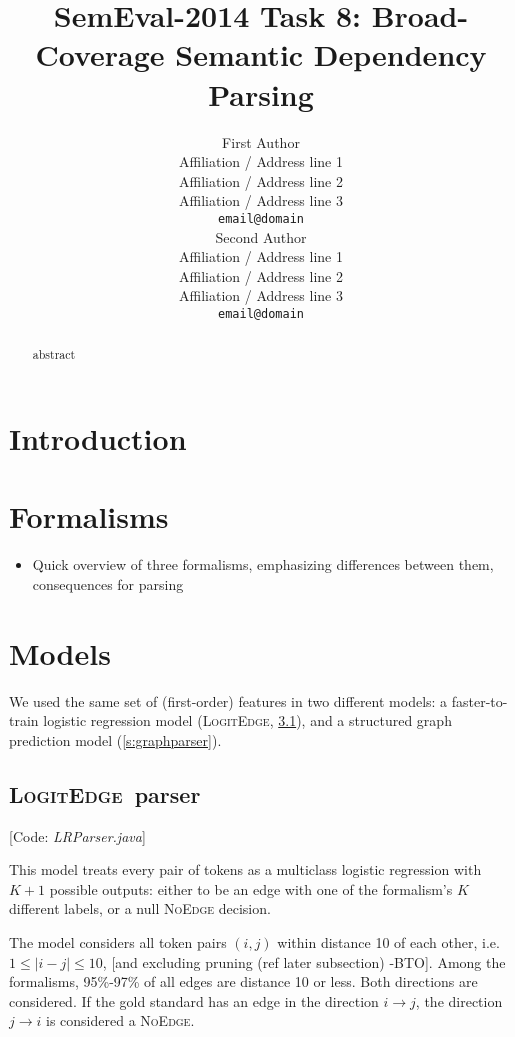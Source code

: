 \documentclass[11pt]{article}
\title{SemEval-2014 Task 8: Broad-Coverage Semantic Dependency Parsing}
\author{First Author \\
  Affiliation / Address line 1 \\
  Affiliation / Address line 2 \\
  Affiliation / Address line 3 \\
  {\tt email@domain} \\\And
  Second Author \\
  Affiliation / Address line 1 \\
  Affiliation / Address line 2 \\
  Affiliation / Address line 3 \\
  {\tt email@domain} \\}
\date{}
\newcommand{\bocomment}[1]{\textcolor{Bittersweet}{[#1 -BTO]}}
\newcommand{\codenote}[1]{\textcolor{PineGreen}{[Code: \emph{#1}]}}
\begin{document}
\maketitle
\begin{abstract}
  abstract
\end{abstract}



\section{Introduction}



\section{Formalisms}

\begin{itemize}
\item Quick overview of three formalisms, emphasizing differences between them, consequences for parsing
\end{itemize}


\section{Models}
\newcommand{\logitedge}{\textsc{LogitEdge}}

We used the same set of (first-order) features
in two different models: a faster-to-train
logistic regression model (\logitedge, \ref{s:logitedge}),
and a structured graph prediction model (\ref{s:graphparser}).


\subsection{\logitedge\ parser} \label{s:logitedge}

\codenote{LRParser.java}

\noindent
This model treats every pair of tokens as a multiclass logistic regression
with $K+1$ possible outputs:
either to be an edge with one of the formalism's $K$ different labels, or a null
\textsc{NoEdge} decision.  

The model considers all token pairs $(i,j)$ within distance 10 of each other, 
i.e.~$1\leq|i-j|\leq 10$, \bocomment{and excluding pruning (ref later subsection)}. Among the formalisms, 95\%-97\% of all edges are distance 10 or less.
Both directions are considered.  If the gold standard has an edge in the direction $i \rightarrow j$, the direction $j\rightarrow i$ is considered a \textsc{NoEdge}.
\end{document}
